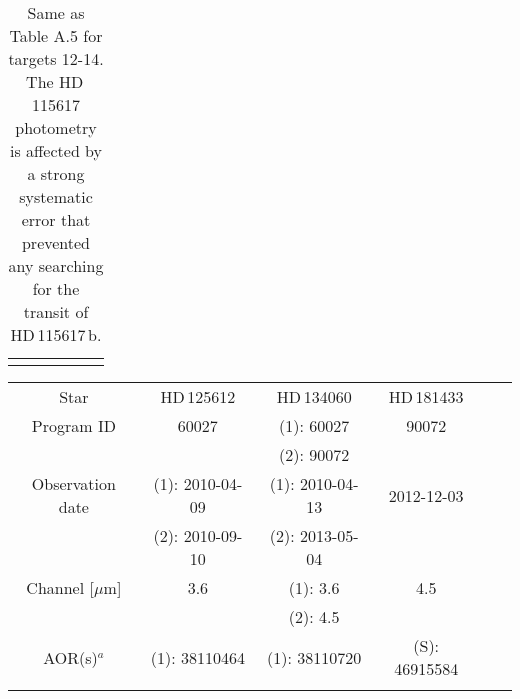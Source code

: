 \documentclass[traditabstract]{aa}
\begin{document}
\begin{appendix}
\begin{table*}
\begin{center}
{\begin{tabular}{cccccc}
\hline \noalign {\smallskip}                                                
\end{tabular}
}
\end{center}
\caption{Same as Table A.5 for targets 12-14.
The HD\,115617 photometry is affected by a strong systematic error that prevented any searching for the transit
of HD\,115617\,b. }
\end{table*}

\begin{table*}
\begin{center}
{\scriptsize
\label{tab:targets}
\begin{tabular}{cccccc}
\hline\noalign {\smallskip}
Star &  HD\,125612 & HD\,134060 & HD\,181433      \\ \noalign {\smallskip}
\hline \noalign {\smallskip}  
Program ID                                                          & 60027                                & (1): 60027                    &  90072                      \\ \noalign {\smallskip} 
                                                                           &                                             & (2): 90072                         &                                \\ \noalign {\smallskip} 
Observation date                                                 & (1): 2010-04-09                      & (1): 2010-04-13                &  2012-12-03                \\ \noalign {\smallskip} 
                                                                            & (2): 2010-09-10                      & (2): 2013-05-04           &                                    \\ \noalign {\smallskip}                                          
Channel       [$\mu$m]                                         & 3.6                                    & (1): 3.6                              & 4.5                              \\ \noalign {\smallskip} 
                                                                            &                                           & (2): 4.5                              &                          \\ \noalign {\smallskip} 
AOR(s)$^a$                                                        & (1): 38110464                  & (1): 38110720                    & (S): 46915584            \\ \noalign {\smallskip}                                                                                      

\end{tabular}}
\end{center}
\end{table*}
\end{appendix}
\end{document}
